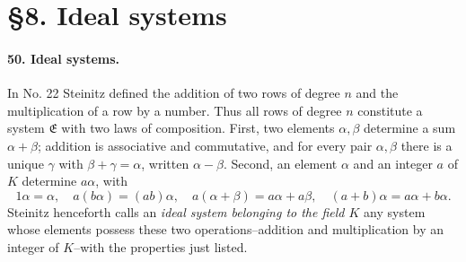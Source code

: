 \documentclass[11pt]{article}
\begin{document}
\section*{\S 8. Ideal systems}

\paragraph{50. Ideal systems.}
In No. 22 Steinitz defined the addition of two rows of degree $n$ and the multiplication of a row by a number. Thus all rows of degree $n$ constitute a system $\mathfrak E$ with two laws of composition. First, two elements $\alpha,
\beta$ determine a sum $\alpha+
\beta$; addition is associative and commutative, and for every pair $\alpha,
\beta$ there is a unique $\gamma$ with $\beta+
\gamma=\alpha$, written $\alpha-
\beta$. Second, an element $\alpha$ and an integer $a$ of $K$ determine $a\alpha$, with
\[
1\alpha=\alpha,
\quad a(b\alpha)=(ab)\alpha,
\quad a(\alpha+
\beta)=a\alpha+a\beta,
\quad (a+b)\alpha=a\alpha+b\alpha.
\]
Steinitz henceforth calls an \emph{ideal system belonging to the field $K$} any system whose elements possess these two operations--addition and multiplication by an integer of $K$--with the properties just listed.
\end{document}
